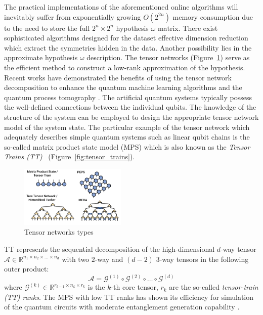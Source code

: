 \documentclass[%
 reprint,
 amsmath,amssymb,
 aps,
]{revtex4-2}
\begin{document}
The practical implementations of the aforementioned online algorithms will inevitably suffer from exponentially growing $O(2^{2n})$ memory consumption due to the  need to store the full $2^n\times2^n$ hypothesis $\omega$ matrix. There exist sophisticated algorithms designed for the dataset effective dimension reduction \cite{} which extract the symmetries hidden in the data. Another possibility lies in the approximate hypothesis $\omega$ description. The tensor networks \cite{tensorTrains, biamonte2019lectures} (Figure~\ref{fig:tensor_networks}) serve as the efficient  method to construct a low-rank approximation of the hypothesis. Recent works have demonstrated the benefits of using the tensor network decomposition to enhance the quantum machine learning algorithms \cite{Huggins_2019} and the quantum process tomography \cite{torlai2020quantum}. The artificial quantum systems typically possess the well-defined connections between the individual qubits. The knowledge of the structure of the system can be employed to design the appropriate tensor network model of the system state. The particular example of the tensor network which adequately describes simple quantum systems such as linear qubit chains is the so-called matrix product state model (MPS) \cite{MPS} which is also known as the {\itshape Tensor Trains (TT)}~\cite{tensorTrainsOs} (Figure~\ref{fig:tensor_trains}).

\begin{figure}
    \centering
    \includegraphics[width=0.45\textwidth]{img/tensor_networks.png}
    \caption{Tensor networks types}
    \label{fig:tensor_networks}
\end{figure}

TT represents the sequential decomposition of the high-dimensional $d$-way tensor $\mathcal{A}\in\mathbb{R}^{n_1\times n_2\times\dots\times n_d}$ with two $2$-way and $(d-2)$ $3$-way tensors in the following outer product:
\begin{equation}
    \label{eq:tt}
    \mathcal{A}=\mathcal{G}^{(1)}\circ\mathcal{G}^{(2)}\circ\dots\circ\mathcal{G}^{(d)}
\end{equation}
where $\mathcal{G}^{(k)}\in\mathbb{R}^{r_{k-1}\times n_k\times r_k}$ is the $k$-th core tensor, $r_k$ are the so-called {\itshape tensor-train (TT) ranks}. The MPS with low TT ranks has shown its efficiency for simulation of the quantum circuits with moderate entanglement generation capability \cite{Waintal2020}.
\end{document}
